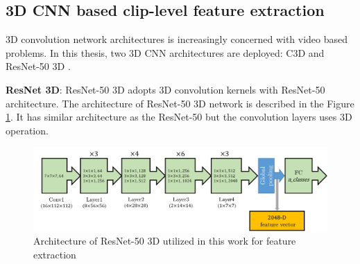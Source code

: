 
\subsection{3D CNN based clip-level feature extraction}
    3D convolution network architectures is increasingly concerned with video based problems. 
    In this thesis, two 3D CNN architectures are deployed: C3D \cite{duta2017spatio} and ResNet-50 3D \cite{hara2018can}. 

    \textbf{ResNet 3D}: ResNet-50 3D adopts 3D convolution kernels with ResNet-50 architecture. %
    The architecture of ResNet-50 3D network is described in the Figure \ref{fig:resnet50_3d}. It has similar architecture as the ResNet-50 but the convolution layers uses 3D operation.  
    \begin{figure}[htbp]
        \centering
        \includegraphics[width=1\linewidth]{Figs/Resnet50_3D.png}
        \caption{Architecture of ResNet-50 3D utilized in this work for feature extraction}
        \label{fig:resnet50_3d}
    \end{figure}

